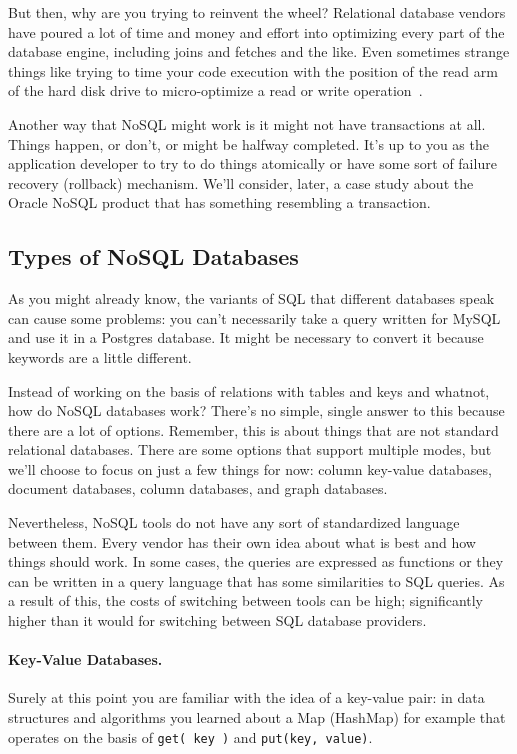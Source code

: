 But then, why are you trying to reinvent the wheel? Relational database vendors have poured a lot of time and money and effort into optimizing every part of the database engine, including joins and fetches and the like. Even sometimes strange things like trying to time your code execution with the position of the read arm of the hard disk drive to micro-optimize a read or write operation~\cite{nosql}. 

Another way that NoSQL might work is it might not have transactions at all. Things happen, or don't, or might be halfway completed. It's up to you as the application developer to try to do things atomically or have some sort of failure recovery (rollback) mechanism. We'll consider, later, a case study about the Oracle NoSQL product that has something resembling a transaction.

\subsection*{Types of NoSQL Databases}

As you might already know, the variants of SQL that different databases speak can cause some problems: you can't necessarily take a query written for MySQL and use it in a Postgres database. It might be necessary to convert it because keywords are a little different.

Instead of working on the basis of relations with tables and keys and whatnot, how do NoSQL databases work? There's no simple, single answer to this because there are a lot of options. Remember, this is about things that are not standard relational databases. There are some options that support multiple modes, but we'll choose to focus on just a few things for now: column key-value databases, document databases, column databases, and graph databases.

Nevertheless, NoSQL tools do not have any sort of standardized language between them. Every vendor has their own idea about what is best and how things should work. In some cases, the queries are expressed as functions or they can be written in a query language that has some similarities to SQL queries. As a result of this, the costs of switching between tools can be high; significantly higher than it would for switching between SQL database providers.


\paragraph{Key-Value Databases.} Surely at this point you are familiar with the idea of a key-value pair: in data structures and algorithms you learned about a Map (HashMap) for example that operates on the basis of \texttt{get( key )} and \texttt{put(key, value)}. 

